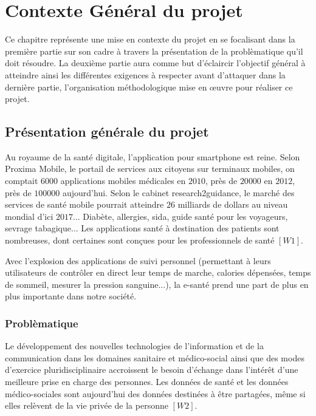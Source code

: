 \chapter{Contexte Général du projet}

Ce chapitre représente une mise en contexte du projet en se focalisant dans la première partie sur son cadre à travers la présentation de la problèmatique qu'il doit résoudre. La deuxième partie aura comme but d'éclaircir l'objectif général à atteindre ainsi les différentes exigences à respecter avant d'attaquer dans la dernière partie, l'organisation méthodologique mise en œuvre pour réaliser ce projet.

\section{Présentation générale du projet}

Au royaume de la santé digitale, l'application pour smartphone est reine. Selon Proxima Mobile, le portail de services aux citoyens sur terminaux mobiles, on comptait $6 000$ applications mobiles médicales en $2010$, près de $20 000$ en $2012$, près de $100 000$ aujourd'hui. Selon le cabinet research2guidance, le marché des services de santé mobile pourrait atteindre $26$ milliards de dollars au niveau mondial d'ici $2017$... Diabète, allergies, sida, guide santé pour les voyageurs, sevrage tabagique... Les applications santé à destination des patients sont nombreuses, dont certaines sont conçues pour les professionnels de santé $[W1]$.

\vspace{6pt}
\paragraphmark

Avec l'explosion des applications de suivi personnel (permettant à leurs utilisateurs de contrôler en direct leur temps de marche, calories dépensées, temps de sommeil, mesurer la pression sanguine...), la e-santé prend une part de plus en plus importante dans notre société.

\subsection{Problèmatique}

Le développement des nouvelles technologies de l’information et de la communication dans les domaines sanitaire et médico-social ainsi que des modes d’exercice pluridisciplinaire accroissent le besoin d’échange dans l’intérêt d’une meilleure prise en charge des personnes. Les données de santé et les données médico-sociales sont aujourd’hui des données destinées à être partagées, même si elles relèvent de la vie privée de la personne $[W2]$.

